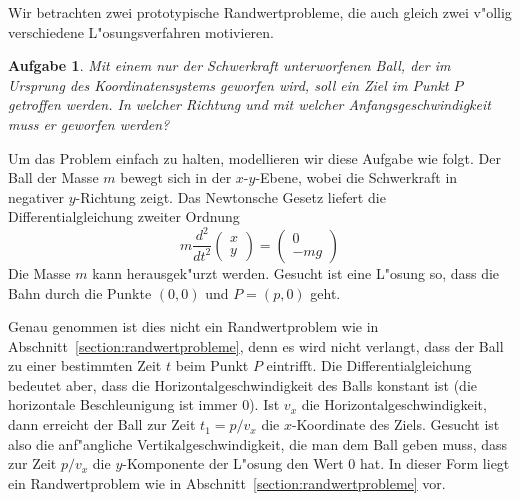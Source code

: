 Wir betrachten zwei prototypische Randwertprobleme, die auch gleich
zwei v"ollig verschiedene L"osungsverfahren motivieren.

\newtheorem{aufgabe}{Aufgabe}[chapter]
\begin{aufgabe}
\label{numerik:aufgabe-ball}
Mit einem nur der Schwerkraft unterworfenen Ball, der im Ursprung des
Koordinatensystems geworfen wird, soll ein Ziel im Punkt $P$ getroffen
werden.
In welcher Richtung und mit welcher Anfangsgeschwindigkeit muss er geworfen
werden?
\end{aufgabe}

Um das Problem einfach zu halten, modellieren wir diese Aufgabe wie
folgt.
Der Ball der Masse $m$ bewegt sich in der $x$-$y$-Ebene, wobei die
Schwerkraft in negativer $y$-Richtung zeigt.
Das Newtonsche Gesetz liefert die Differentialgleichung zweiter Ordnung
\begin{equation}
m\frac{d^2}{dt^2}\begin{pmatrix}x\\y\end{pmatrix}
=
\begin{pmatrix}
0\\-mg
\end{pmatrix}
\label{numerik:ball-dgl}
\end{equation}
Die Masse $m$ kann herausgek"urzt werden.
Gesucht ist eine L"osung so, dass die Bahn durch die Punkte $(0,0)$
und $P=(p,0)$ geht.

Genau genommen ist dies nicht ein Randwertproblem wie in 
Abschnitt~\ref{section:randwertprobleme}, denn es wird nicht verlangt,
dass der Ball zu einer bestimmten Zeit $t$ beim Punkt $P$ eintrifft.
Die Differentialgleichung bedeutet aber, dass die Horizontalgeschwindigkeit
des Balls konstant ist (die horizontale Beschleunigung ist immer $0$).
Ist $v_x$ die Horizontalgeschwindigkeit, dann erreicht der Ball zur
Zeit $t_1=p/v_x$ die $x$-Koordinate des Ziels.
Gesucht ist also die anf"angliche Vertikalgeschwindigkeit, die man
dem Ball geben muss, dass zur Zeit $p/v_x$ die $y$-Komponente
der L"osung den Wert $0$ hat.
In dieser Form liegt ein Randwertproblem wie in
Abschnitt~\ref{section:randwertprobleme} vor.

